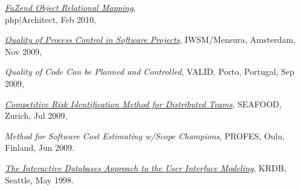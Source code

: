 \begin{samepage}
\emph{\href{https://www.yegor256.com/pdf/2010/phpArchitect-fazend-orm.pdf}{FaZend Object Relational Mapping}},\\
php$|$Architect, Feb 2010,
\end{samepage}

\begin{samepage}
\emph{\href{https://www.yegor256.com/pdf/2009/IWSM09-article.pdf}{Quality of Process Control in Software Projects}},\newline
IWSM/Mensura, Amsterdam, Nov 2009,
\end{samepage}

\begin{samepage}
\emph{Quality of Code Can be Planned and Controlled},\newline
VALID, Porto, Portugal, Sep 2009,
\end{samepage}

\begin{samepage}
\emph{\href{https://www.yegor256.com/pdf/2009/SEAFOOD09-article.pdf}{Competitive Risk Identification Method for Distributed Teams}},\newline
SEAFOOD, Zurich, Jul 2009,
\end{samepage}

\begin{samepage}
\emph{Method for Software Cost Estimating w/Scope Champions},\newline
PROFES, Oulu, Finland, Jun 2009.
\end{samepage}

\begin{samepage}
\emph{\href{https://www.yegor256.com/pdf/1998/KRDB98-article.pdf}{The Interactive Databases Approach to the User Interface Modeling}},\newline
KRDB, Seattle, May 1998.
\end{samepage}


